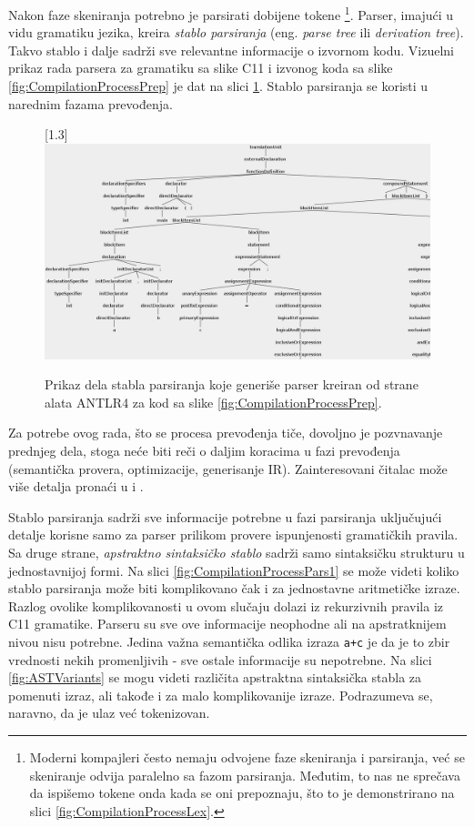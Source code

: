 Nakon faze skeniranja potrebno je parsirati dobijene tokene
\footnote{Moderni kompajleri često nemaju odvojene faze skeniranja i parsiranja, već se skeniranje odvija paralelno sa fazom parsiranja. Međutim, to nas ne sprečava da ispišemo tokene onda kada se oni prepoznaju, što to je demonstrirano na slici \ref{fig:CompilationProcessLex}.}.
Parser, imajući u vidu gramatiku jezika, kreira \emph{stablo parsiranja} (eng. \emph{parse tree} ili \emph{derivation tree}). Takvo stablo i dalje sadrži sve relevantne informacije o izvornom kodu. Vizuelni prikaz rada parsera za gramatiku sa slike C11 i izvonog koda sa slike \ref{fig:CompilationProcessPrep} je dat na slici \ref{fig:CompilationProcessPars}. Stablo parsiranja se koristi u narednim fazama prevođenja.

\begin{figure}[h!]
\centering
\scalebox{0.95}[1.3] {
    \includegraphics[width=\textwidth]{images/parse_tree.png}
}
\caption{Prikaz dela stabla parsiranja koje generiše parser kreiran od strane alata ANTLR4 \cite{ANTLR} za kod sa slike \ref{fig:CompilationProcessPrep}.}
\label{fig:CompilationProcessPars}
\end{figure}

Za potrebe ovog rada, što se procesa prevođenja tiče, dovoljno je pozvnavanje prednjeg dela, stoga neće biti reči o daljim koracima u fazi prevođenja (semantička provera, optimizacije, generisanje IR). Zainteresovani čitalac može više detalja pronaći u \cite{EngineeringCompilers} i \cite{CompilerConstruction}. 

Stablo parsiranja sadrži sve informacije potrebne u fazi parsiranja uključujući detalje korisne samo za parser prilikom provere ispunjenosti gramatičkih pravila. Sa druge strane, \emph{apstraktno sintaksičko stablo} sadrži samo sintaksičku strukturu u jednostavnijoj formi. Na slici \ref{fig:CompilationProcessPars1} se može videti koliko stablo parsiranja može biti komplikovano čak i za jednostavne aritmetičke izraze. Razlog ovolike komplikovanosti u ovom slučaju dolazi iz rekurzivnih pravila iz C11 gramatike. Parseru su sve ove informacije neophodne ali na apstratknijem nivou nisu potrebne. Jedina važna semantička odlika izraza \texttt{a+c} je da je to zbir vrednosti nekih promenljivih - sve ostale informacije su nepotrebne. Na slici \ref{fig:ASTVariants} se mogu videti različita apstraktna sintaksička stabla za pomenuti izraz, ali takođe i za malo komplikovanije izraze. Podrazumeva se, naravno, da je ulaz već tokenizovan. 

